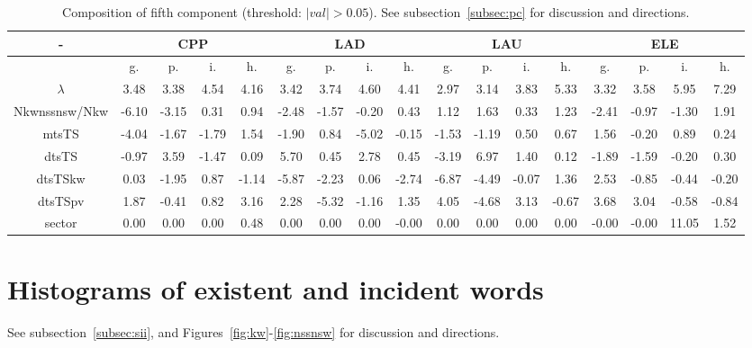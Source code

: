 \documentclass[%
 aip,
 jmp,%
 amsmath,amssymb,
 reprint,%
]{revtex4-1}
\begin{document}
\begin{table}
\begin{tabular}{|c|| c|c|c|c|| c|c|c|c|| c|c|c|c|| c|c|c|c|}\hline
  \centering
    \scriptsize
\setlength{\tabcolsep}{.06667em}
-\-  & \multicolumn{4}{c|}{CPP} & \multicolumn{4}{c|}{LAD} & \multicolumn{4}{c|}{LAU} & \multicolumn{4}{c|}{ELE} \\ \hline\hline
 & g. & p. & i. & h. &     g. & p. & i. & h. &    g. & p. & i. & h. &    g. & p. & i. & h. \\\hline
$\lambda$ & 3.48 & 3.38 & 4.54 & 4.16 & 3.42 & 3.74 & 4.60 & 4.41 & 2.97 & 3.14 & 3.83 & 5.33 & 3.32 & 3.58 & 5.95 & 7.29 \\\hline
Nkwnssnsw/Nkw & -6.10 & -3.15 & 0.31 & 0.94 & -2.48 & -1.57 & -0.20 & 0.43 & 1.12 & 1.63 & 0.33 & 1.23 & -2.41 & -0.97 & -1.30 & 1.91 \\\hline
mtsTS & -4.04 & -1.67 & -1.79 & 1.54 & -1.90 & 0.84 & -5.02 & -0.15 & -1.53 & -1.19 & 0.50 & 0.67 & 1.56 & -0.20 & 0.89 & 0.24 \\\hline
dtsTS & -0.97 & 3.59 & -1.47 & 0.09 & 5.70 & 0.45 & 2.78 & 0.45 & -3.19 & 6.97 & 1.40 & 0.12 & -1.89 & -1.59 & -0.20 & 0.30 \\\hline
dtsTSkw & 0.03 & -1.95 & 0.87 & -1.14 & -5.87 & -2.23 & 0.06 & -2.74 & -6.87 & -4.49 & -0.07 & 1.36 & 2.53 & -0.85 & -0.44 & -0.20 \\\hline
dtsTSpv & 1.87 & -0.41 & 0.82 & 3.16 & 2.28 & -5.32 & -1.16 & 1.35 & 4.05 & -4.68 & 3.13 & -0.67 & 3.68 & 3.04 & -0.58 & -0.84 \\\hline
sector & 0.00 & 0.00 & 0.00 & 0.48 & 0.00 & 0.00 & 0.00 & -0.00 & 0.00 & 0.00 & 0.00 & 0.00 & -0.00 & -0.00 & 11.05 & 1.52 \\\hline
\end{tabular}
  \caption{Composition of fifth component (threshold: $|val|>0.05$). See subsection~\ref{subsec:pc} for discussion and directions.}\label{tab:pca5}
\end{table}

\clearpage
\newpage
\section{Histograms of existent and incident words}\label{sec:resE}
 See subsection~\ref{subsec:sii}, and Figures~\ref{fig:kw}-\ref{fig:nssnsw} for discussion and directions.
\end{document}
